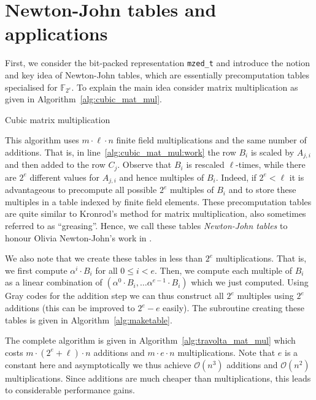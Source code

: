 \documentclass{sig-alternate}
\newcommand{\ring}[1]{\mathbb{#1}}
\newcommand{\FZE}{\ensuremath{\ring{F}_{2^e}}\xspace}
\newcommand{\ord}[1]{\ensuremath{\mathcal{O}\!\left(#1\right)}}
\newcommand{\mzedt}{\texttt{mzed\-\_t}\xspace}
\begin{document}
\section{Newton-John tables and applications} \label{sec:newton-john}

First, we consider the bit-packed representation \mzedt and introduce the notion and key idea of Newton-John tables, which are essentially precomputation tables specialised for $\FZE$. To explain the main idea consider matrix multiplication as given in Algorithm~\ref{alg:cubic_mat_mul}.

\begin{algorithm}[h]
\caption{Cubic matrix multiplication}
\label{alg:cubic_mat_mul}
\end{algorithm}

This algorithm uses $m\cdot \ell \cdot n$ finite field multiplications and the same number of additions. That is, in line~\ref{alg:cubic_mat_mul:work} the row $B_i$ is scaled by $A_{j,i}$ and then added to the row $C_j$. Observe that $B_i$ is rescaled $\ell$-times, while there are $2^e$ different values for $A_{j,i}$ and hence multiples of $B_i$. Indeed, if $2^e < \ell$ it is advantageous to precompute all possible $2^e$ multiples of $B_i$ and  to store these multiples in a table indexed by finite field elements. These precomputation tables are quite similar to Kronrod's method for matrix multiplication, also sometimes referred to as ``greasing''. Hence, we call these tables \emph{Newton-John tables} to honour Olivia Newton-John's work in \cite{grease}.

We also note that we create these tables in less than $2^e$ multiplications. That is, we first compute $\alpha^i \cdot B_i$ for all $0 \leq i < e$. Then, we compute each multiple of $B_i$ as a linear combination of $(\alpha^0\cdot B_i,\dots \alpha^{e-1}\cdot B_i)$ which we just computed. Using Gray codes for the addition step we can thus construct all $2^e$ multiples using $2^e$ additions \cite{graycode} (this can be improved to $2^e -e$ easily). The subroutine creating these tables is given in Algorithm~\ref{alg:maketable}.

The complete algorithm is given in Algorithm~\ref{alg:travolta_mat_mul} which costs $m \cdot (2^e + \ell) \cdot n$ additions and $m \cdot e \cdot n$ multiplications. Note that $e$ is a constant here and asymptotically we thus achieve $\ord{n^3}$ additions and $\ord{n^2}$ multiplications. Since additions are much cheaper than multiplications, this leads to considerable performance gains.
\end{document}
